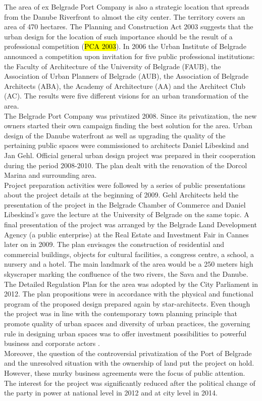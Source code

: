 \documentclass[11pt]{report}
\begin{document}
\begin{itemize}
The area of ex Belgrade Port Company is also a strategic location that spreads from the Danube Riverfront to almost the city center. The territory covers an area of 470 hectares.
The Planning and Construction Act 2003 suggests that the urban design for the location of such importance should be the result of a professional competition (\hl{PCA 2003}).
In 2006 the Urban Institute of Belgrade announced a competition upon invitation for five public professional institutions: the  Faculty  of  Architecture  of  the  University  of  Belgrade (FAUB),  the Association  of  Urban  Planners  of  Belgrade (AUB),  the Association  of Belgrade Architects (ABA),  the  Academy  of  Architecture (AA)  and  the  Architect Club (AC). The results were five different visions for an urban transformation of the area.
\\
The  Belgrade Port Company was privatized 2008. Since its privatization,  the new owners started their own campaign finding the best solution for the area.
Urban design of the Danube waterfront as well as upgrading the quality of the pertaining public spaces were commissioned to architects Daniel Libeskind and Jan Gehl.
Official general urban design  project was prepared in their cooperation during the period 2008-2010.
The plan dealt with the renovation of the Dorcol Marina and surrounding area.
\\
Project preparation activities were followed by a series of public presentations about the project details at the beginning of 2009. Gehl Architects held the presentation of the project in the Belgrade Chamber of Commerce and Daniel Libeskind's gave the lecture at the University of Belgrade on the same topic.
A final presentation of the project was arranged by the Belgrade Land Development Agency (a public enterprise) at the Real Estate and Investment Fair in Cannes later on in 2009.
The  plan  envisages  the  construction of  residential  and  commercial  buildings,  objects for cultural facilities, a congress centre, a school, a nursery and a hotel.
The main landmark of the area would be a 250 meters high skyscraper marking the confluence of the two rivers, the Sava and the Danube.
\\
The  Detailed  Regulation Plan for the area was adopted by the City  Parliament in 2012. The plan propositions  were in accordance with the physical and functional program of the proposed design prepared again by star-architects.
Even though the project was in  line  with  the contemporary town planning principle that promote quality of urban spaces and diversity of urban practices, the governing rule in designing urban spaces was to offer investment possibilities to powerful business and corporate actors \cite{Vukmirovic in Doytchinov et al 2015}.
\\
Moreover, the question of the controversial privatization of the Port of Belgrade and the unresolved situation with the ownership of land put the project on hold. However, these murky business agreements were the focus of public attention.
The interest for the project was significantly reduced after the political change of the party in power at national level in 2012 and at city level in 2014. 


\end{itemize}
\end{document}
